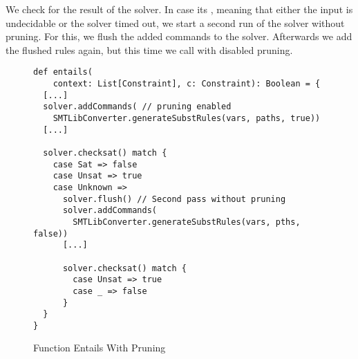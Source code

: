 We check for the result of the solver.
In case its ,
meaning that either the input is undecidable or
the solver timed out,
we start a second run of the solver without pruning.
For this, we flush the added commands to the solver.
Afterwards we add the flushed rules again,
but this time we call  with disabled pruning.
%
\begin{figure}[t]
\begin{lstlisting}
def entails(
    context: List[Constraint], c: Constraint): Boolean = {
  [...]
  solver.addCommands( // pruning enabled
    SMTLibConverter.generateSubstRules(vars, paths, true))
  [...]

  solver.checksat() match {
    case Sat => false
    case Unsat => true
    case Unknown =>
      solver.flush() // Second pass without pruning
      solver.addCommands(
        SMTLibConverter.generateSubstRules(vars, pths, false))
      [...]

      solver.checksat() match {
        case Unsat => true
        case _ => false
      }
  }
}
\end{lstlisting}
\caption{Function Entails With Pruning}
\label{fig:scala-entails-twopass}
\end{figure}


